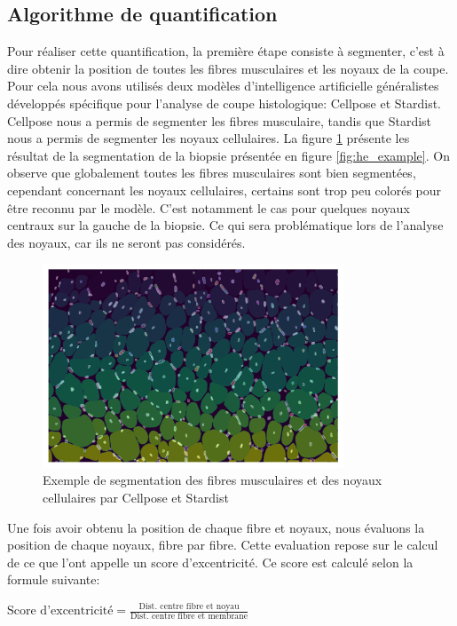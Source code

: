 \subsection{Algorithme de quantification}
Pour réaliser cette quantification, la première étape consiste à segmenter, c'est à dire obtenir la position de toutes les fibres musculaires et les noyaux de la coupe. Pour cela nous avons utilisés deux modèles d'intelligence artificielle généralistes développés spécifique pour l'analyse de coupe histologique: Cellpose et Stardist. Cellpose nous a permis de segmenter les fibres musculaire, tandis que Stardist nous a permis de segmenter les noyaux cellulaires. La figure \ref{fig:he_seg} présente les résultat de la segmentation de la biopsie présentée en figure \ref{fig:he_example}. On observe que globalement toutes les fibres musculaires sont bien segmentées, cependant concernant les noyaux cellulaires, certains sont trop peu colorés pour être reconnu par le modèle. C'est notamment le cas pour quelques noyaux centraux sur la gauche de la biopsie. Ce qui sera problématique lors de l'analyse des noyaux, car ils ne seront pas considérés.
\begin{figure}[htbp]
 \centering
 \includegraphics[width=0.8\textwidth]{figures/he_seg.png}
 \caption[Exemple de segmentation de biopsie par Cellpose et Stardist]{Exemple de segmentation des fibres musculaires et des noyaux cellulaires par Cellpose et Stardist}
 \label{fig:he_seg}
\end{figure}

Une fois avoir obtenu la position de chaque fibre et noyaux, nous évaluons la position de chaque noyaux, fibre par fibre. Cette evaluation repose sur le calcul de ce que l'ont appelle un score d'excentricité. Ce score est calculé selon la formule suivante:

\(\text{Score d'excentricité} = \frac{\text{Dist. centre fibre et noyau}}{\text{Dist. centre fibre et membrane}}\)

